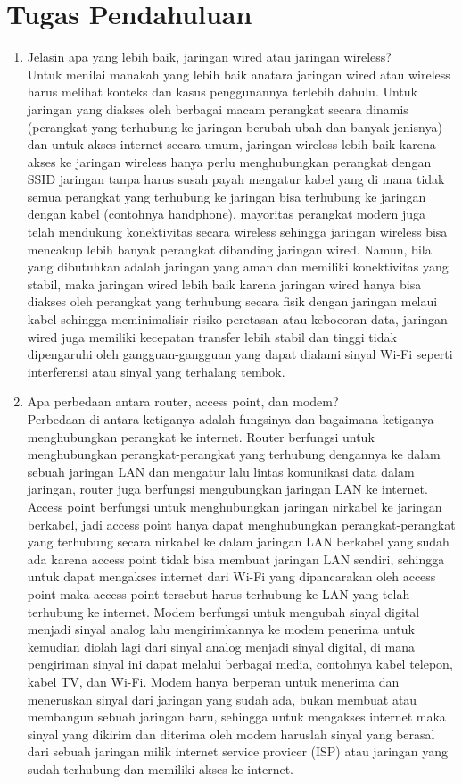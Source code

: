 \section{Tugas Pendahuluan}
\begin{enumerate}
	\item Jelasin apa yang lebih baik, jaringan wired atau jaringan wireless?\\
	Untuk menilai manakah yang lebih baik anatara jaringan wired atau wireless harus melihat konteks dan kasus penggunannya terlebih dahulu. Untuk jaringan yang diakses oleh berbagai macam perangkat secara dinamis (perangkat yang terhubung ke jaringan berubah-ubah dan banyak jenisnya) dan untuk akses internet secara umum, jaringan wireless lebih baik karena akses ke jaringan wireless hanya perlu menghubungkan perangkat dengan SSID jaringan tanpa harus susah payah mengatur kabel yang di mana tidak semua perangkat yang terhubung ke jaringan bisa terhubung ke jaringan dengan kabel (contohnya handphone), mayoritas perangkat modern juga telah mendukung konektivitas secara wireless sehingga jaringan wireless bisa mencakup lebih banyak perangkat dibanding jaringan wired. Namun, bila yang dibutuhkan adalah jaringan yang aman dan memiliki konektivitas yang stabil, maka jaringan wired lebih baik karena jaringan wired hanya bisa diakses oleh perangkat yang terhubung secara fisik dengan jaringan melaui kabel sehingga meminimalisir risiko peretasan atau kebocoran data, jaringan wired juga memiliki kecepatan transfer lebih stabil dan tinggi tidak dipengaruhi oleh gangguan-gangguan yang dapat dialami sinyal Wi-Fi seperti interferensi atau sinyal yang terhalang tembok.
	\item Apa perbedaan antara router, access point, dan modem?\\
	Perbedaan di antara ketiganya adalah fungsinya dan bagaimana ketiganya menghubungkan perangkat ke internet. Router berfungsi untuk menghubungkan perangkat-perangkat yang terhubung dengannya ke dalam sebuah jaringan LAN dan mengatur lalu lintas komunikasi data dalam jaringan, router juga berfungsi mengubungkan jaringan LAN ke internet. Access point berfungsi untuk menghubungkan jaringan nirkabel ke jaringan berkabel, jadi access point hanya dapat menghubungkan perangkat-perangkat yang terhubung secara nirkabel ke dalam jaringan LAN berkabel yang sudah ada karena access point tidak bisa membuat jaringan LAN sendiri, sehingga untuk dapat mengakses internet dari Wi-Fi yang dipancarakan oleh access point maka access point tersebut harus terhubung ke LAN yang telah terhubung ke internet. Modem berfungsi untuk mengubah sinyal digital menjadi sinyal analog lalu mengirimkannya ke modem penerima untuk kemudian diolah lagi dari sinyal analog menjadi sinyal digital, di mana pengiriman sinyal ini dapat melalui berbagai media, contohnya kabel telepon, kabel TV, dan Wi-Fi. Modem hanya berperan untuk menerima dan meneruskan sinyal dari jaringan yang sudah ada, bukan membuat atau membangun sebuah jaringan baru, sehingga untuk mengakses internet maka sinyal yang dikirim dan diterima oleh modem haruslah sinyal yang berasal dari sebuah jaringan milik internet service provicer (ISP) atau jaringan yang sudah terhubung dan memiliki akses ke internet.

\end{enumerate}
